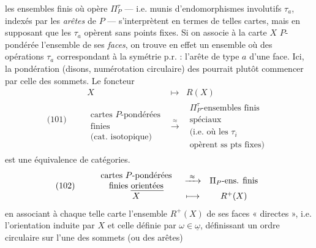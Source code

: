 \documentclass[11pt,a4paper]{article}
\begin{document}
les \struck{\ill{}} ensembles finis où opère $\Pi_P^\tau$ — i.e. munis d'endomorphismes \struck{\ill{}} involutifs $\tau_a$, indexés par les \emph{arêtes} de $P$ — s'interprètent en termes de telles cartes, mais en supposant que les $\tau_a$ opèrent sans points fixes. \struck{\ill{}} Si on associe à la carte $X$ $P$-pondérée l'ensemble  de ses \emph{faces}, on trouve en effet un ensemble où des opérations $\tau_a$  correspondant à la symétrie p.r. \struck{\ill{}} : l'arête de type $a$ d'une face. Ici, la pondération (disons,  numérotation circulaire) des \struck{\ill{}}  pourrait plutôt commencer par celle des sommets. Le foncteur
\[
  \text{(101)}\qquad
  \begin{array}{ccc}
    X & \longmapsto & R(X) \\[2pt]
    \begin{array}{c}\text{cartes $P$-pondérées}\\ \text{finies}\\ \text{(cat. isotopique)}\end{array}
    & \xrightarrow{\ \approx\ } &
    \begin{array}{c}\Pi_P^\tau\text{-ensembles finis}\\ \text{spéciaux}\\ \text{(i.e. où les $\tau_i$}\\ \text{opèrent ss pts fixes)}\end{array}
  \end{array}
\]
est une équivalence de catégories.   
\struck{\ill{} \ill{} \ill{} \ill{}}
\[
  \text{(102)}\qquad
  \begin{array}{ccc}
    \begin{array}{c}\text{cartes $P$-pondérées}\\ \text{finies \emph{orientées}}\end{array}
    & \xrightarrow{\ \approx\ } & \Pi_P\text{-ens. finis} \\[2pt]
    X & \longmapsto & R^+(X)
  \end{array}
\]
en associant à chaque telle carte l'ensemble $R^+(X)$ de ses  faces « directes », i.e. \struck{\ill{}} l'orientation induite par $X$ et celle définie par $\omega \in \underline{\omega}$, définissant un ordre circulaire sur l'une des sommets (ou des arêtes)
\end{document}
